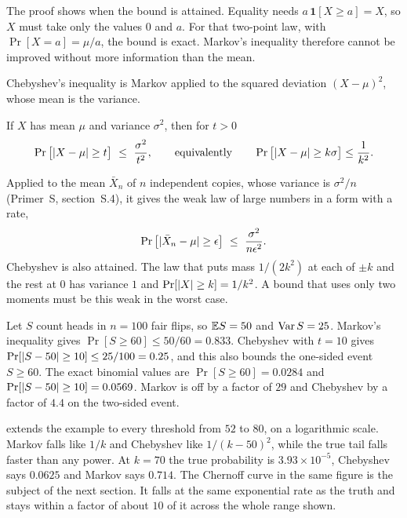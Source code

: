 The proof shows when the bound is attained. Equality needs $a\,\mathbf 1[X\ge a]=X$, so $X$ must take only the values $0$ and $a$. For that two-point law, with $\Pr[X=a]=\mu/a$, the bound is exact. Markov's inequality therefore cannot be improved without more information than the mean.

Chebyshev's inequality is Markov applied to the squared deviation $(X-\mu)^2$, whose mean is the variance.
\begin{theorem}[Chebyshev]\label{thm:ch12:chebyshev}
If $X$ has mean $\mu$ and variance $\sigma^2$, then for $t>0$
\begin{equation}
\Pr\big[\abs{X-\mu}\ge t\big]\ \le\ \frac{\sigma^2}{t^2},
\qquad\text{equivalently}\qquad
\Pr\big[\abs{X-\mu}\ge k\sigma\big]\le\frac1{k^2}.
\label{eq:ch12:chebyshev}
\end{equation}
\end{theorem}
Applied to the mean $\bar X_n$ of $n$ independent copies, whose variance is $\sigma^2/n$ (Primer~S, section~S.4), it gives the weak law of large numbers in a form with a rate,
\begin{equation}
\Pr\big[\lvert \bar X_n-\mu\rvert\ge\epsilon\big]\ \le\ \frac{\sigma^2}{n\epsilon^2}.
\label{eq:ch12:wlln}
\end{equation}
Chebyshev is also attained. The law that puts mass $1/(2k^2)$ at each of $\pm k$ and the rest at $0$ has variance $1$ and $\Pr[\lvert X\rvert\ge k]=1/k^2$. A bound that uses only two moments must be this weak in the worst case.

\begin{example}\label{ex:ch12:coins}
Let $S$ count heads in $n=100$ fair flips, so $\mathbb{E} S=50$ and $\operatorname{Var} S=25$. Markov's inequality gives $\Pr[S\ge60]\le 50/60=0.833$. Chebyshev with $t=10$ gives $\Pr[\lvert S-50\rvert\ge10]\le25/100=0.25$, and this also bounds the one-sided event $S\ge60$. The exact binomial values are $\Pr[S\ge60]=0.0284$ and $\Pr[\lvert S-50\rvert\ge10]=0.0569$. Markov is off by a factor of $29$ and Chebyshev by a factor of $4.4$ on the two-sided event.
\end{example}

 extends the example to every threshold from $52$ to $80$, on a logarithmic scale. Markov falls like $1/k$ and Chebyshev like $1/(k-50)^2$, while the true tail falls faster than any power. At $k=70$ the true probability is $3.93\times10^{-5}$, Chebyshev says $0.0625$ and Markov says $0.714$. The Chernoff curve in the same figure is the subject of the next section. It falls at the same exponential rate as the truth and stays within a factor of about $10$ of it across the whole range shown.

